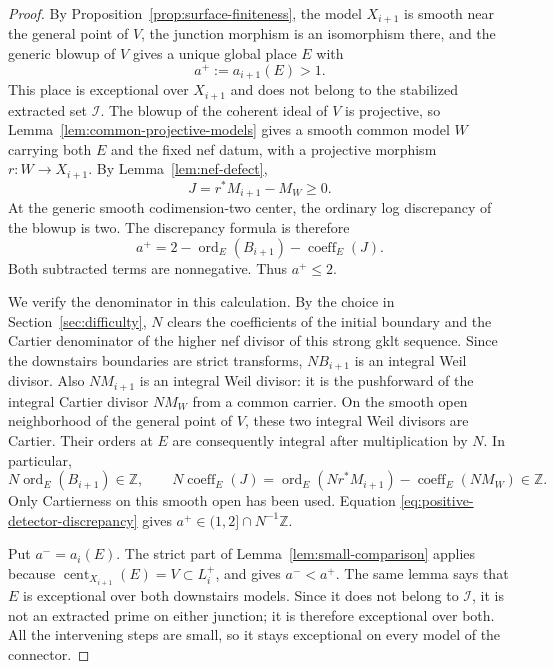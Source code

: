 \documentclass[11pt]{amsart}
\theoremstyle{definition}
\theoremstyle{remark}
\numberwithin{equation}{section}
\newcommand{\Z}{\mathbb{Z}}
\DeclareMathOperator{\cent}{cent}
\DeclareMathOperator{\ord}{ord}
\begin{document}
\begin{proof}
By Proposition~\ref{prop:surface-finiteness}, the model \(X_{i+1}\) is
smooth near the general point of \(V\), the junction morphism is an
isomorphism there, and the generic blowup of \(V\) gives a unique global
place \(E\) with
\[
 a^+:=a_{i+1}(E)>1.
\]
This place is exceptional over \(X_{i+1}\) and does not belong to the
stabilized extracted set \(\mathcal I\).  The blowup of the coherent ideal
of \(V\) is projective, so Lemma~\ref{lem:common-projective-models} gives a
smooth common model \(W\) carrying both \(E\) and the fixed nef datum,
with a projective morphism \(r:W\to X_{i+1}\).  By Lemma~\ref{lem:nef-defect},
\[
 J=r^*M_{i+1}-M_W\geq0.
\]
At the generic smooth codimension-two center, the ordinary log discrepancy
of the blowup is two.  The discrepancy formula is therefore
\begin{equation}\label{eq:positive-detector-discrepancy}
 a^+=2-\ord_E(B_{i+1})-\operatorname{coeff}_E(J).
\end{equation}
Both subtracted terms are nonnegative.  Thus \(a^+\leq2\).

We verify the denominator in this calculation.  By the choice in
Section~\ref{sec:difficulty}, \(N\) clears the coefficients of the initial
boundary and the Cartier denominator of the higher nef divisor of this
strong gklt sequence.  Since the downstairs boundaries are strict
transforms, \(NB_{i+1}\) is an integral Weil divisor.  Also \(NM_{i+1}\)
is an integral Weil divisor: it is the pushforward of the integral Cartier
divisor \(NM_W\) from a common carrier.  On the smooth open neighborhood of
the general point of \(V\), these two integral Weil divisors are Cartier.
Their orders at \(E\) are consequently integral after multiplication by
\(N\).  In particular,
\[
 N\ord_E(B_{i+1})\in\Z,
 \qquad
 N\operatorname{coeff}_E(J)
 =\ord_E(Nr^*M_{i+1})-\operatorname{coeff}_E(NM_W)\in\Z.
\]
Only Cartierness on this smooth open has been used.  Equation
\eqref{eq:positive-detector-discrepancy} gives
\(a^+\in(1,2]\cap N^{-1}\Z\).

Put \(a^-=a_i(E)\).  The strict part of
Lemma~\ref{lem:small-comparison} applies because
\(\cent_{X_{i+1}}(E)=V\subset L_i^+\), and gives \(a^-<a^+\).  The same
lemma says that \(E\) is exceptional over both downstairs models.  Since
it does not belong to \(\mathcal I\), it is not an extracted prime on either
junction; it is therefore exceptional over both.  All the intervening
steps are small, so it stays exceptional on every model of the connector.


\end{proof}
\end{document}
